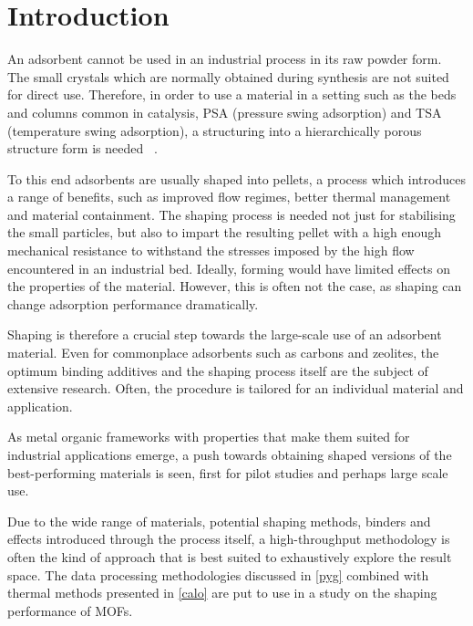 
\section{Introduction}

An adsorbent cannot be used in an industrial process in its raw powder
form. The small crystals which are normally obtained during synthesis
are not suited for direct use. Therefore, in order to use a 
material in a setting such 
as the beds and columns common in catalysis, PSA (pressure swing 
adsorption) and TSA (temperature swing adsorption), a structuring 
into a hierarchically porous structure form is needed
~\cite{akhtarStructuringAdsorbentsCatalysts2014}.

To this end adsorbents are usually shaped into pellets, a process
which introduces a range of benefits, such as improved flow regimes,
better thermal management and material containment. The shaping process
is needed not just for stabilising the small particles, but also to
impart the resulting pellet with a high enough mechanical resistance 
to withstand the stresses imposed by the high flow encountered in 
an industrial bed. Ideally, forming would have limited effects on
the properties of the material. However, this is often not the case, 
as shaping can change adsorption performance dramatically.

Shaping is therefore a crucial step towards the large-scale
use of an adsorbent material. Even for commonplace adsorbents such as
carbons and zeolites, the optimum binding additives and the shaping
process itself are the subject of extensive research. Often, the
procedure is tailored for an individual material and application.

As metal organic frameworks with properties that make them suited 
for industrial applications emerge, a push towards obtaining shaped
versions of the best-performing materials is seen, first for 
pilot studies and perhaps large scale use.

Due to the wide range of materials, potential shaping methods, binders 
and effects introduced through the process itself, a high-throughput
methodology is often the kind of approach that is best suited to 
exhaustively explore the result space. The data processing methodologies
discussed in \autoref{pyg} combined with thermal methods
presented in \autoref{calo} are put to use in a study on the 
shaping performance of MOFs.


